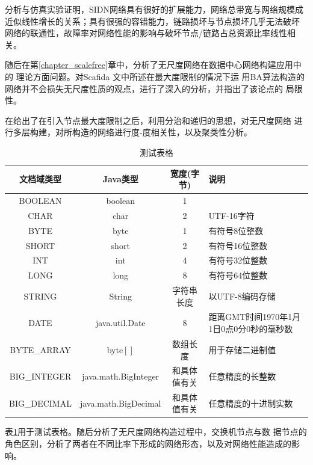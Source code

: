 \documentclass[bachelor,adobefonts]{jnuthesis} %
\begin{document}
    分析与仿真实验证明，SIDN网络具有很好的扩展能力，网络总带宽与网络规模成
    近似线性增长的关系；具有很强的容错能力，链路损坏与节点损坏几乎无法破坏
    网络的联通性，故障率对网络性能的影响与破坏节点/链路占总资源比率线性相关。
    
    随后在第\ref{chapter_scalefree}章中，分析了无尺度网络在数据中心网络构建应用中的
    理论方面问题。对Scafida \cite{gyarmati2010scafida}文中所述在最大度限制的情况下运
    用BA算法构造的网络并不会损失无尺度性质的观点，进行了深入的分析，并指出了该论点的
    局限性。
    
    在给出了在引入节点最大度限制之后，利用分治和递归的思想，对无尺度网络
    进行多层构建，对所构造的网络进行度-度相关性，以及聚类性分析。
    
    \begin{table}
        \centering
        \begin{tabular}{cccp{38mm}}
            \toprule
            \textbf{文档域类型} & \textbf{Java类型} & \textbf{宽度(字节)} & \textbf{说明} \\
            \midrule
            BOOLEAN  & boolean &  1  & \\
            CHAR     & char    &  2  & UTF-16字符 \\
            BYTE     & byte    &  1  & 有符号8位整数 \\
            SHORT    & short   &  2  & 有符号16位整数 \\
            INT      & int     &  4  & 有符号32位整数 \\
            LONG     & long    &  8  & 有符号64位整数 \\
            STRING   & String  &  字符串长度  & 以UTF-8编码存储 \\
            DATE     & java.util.Date & 8 & 距离GMT时间1970年1月1日0点0分0秒的毫秒数 \\
            BYTE\_ARRAY & byte$[]$ & 数组长度 & 用于存储二进制值 \\
            BIG\_INTEGER & java.math.BigInteger & 和具体值有关 & 任意精度的长整数 \\
            BIG\_DECIMAL & java.math.BigDecimal & 和具体值有关 & 任意精度的十进制实数 \\
            \bottomrule
        \end{tabular}
        \caption{测试表格}\label{table:test5}
    \end{table}
    
    表\ref{table:test5}用于测试表格。随后分析了无尺度网络构造过程中，交换机节点与数
    据节点的角色区别，分析了两者在不同比率下形成的网络形态，以及对网络性能造成的影响。
    
\end{document}
